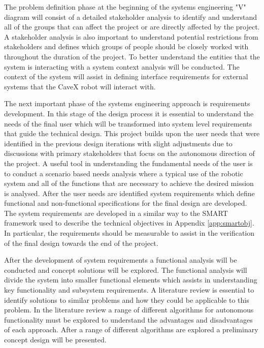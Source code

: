 The problem definition phase at the beginning of the systems engineering "V" diagram will consist of a detailed stakeholder analysis to identify and understand all of the groups that can affect the project or are directly affected by the project. A stakeholder analysis is also important to understand potential restrictions from stakeholders and defines which groups of people should be closely worked with throughout the duration of the project. To better understand the entities that the system is interacting with a system context analysis will be conducted. The context of the system will assist in defining interface requirements for external systems that the CaveX robot will interact with.

The next important phase of the systems engineering approach is requirements development. In this stage of the design process it is essential to understand the needs of the final user which will be transformed into system level requirements that guide the technical design. This project builds upon the user needs that were identified in the previous design iterations with slight adjustments due to discussions with primary stakeholders that focus on the autonomous direction of the project. A useful tool in understanding the fundamental needs of the user is to conduct a scenario based needs analysis where a typical use of the robotic system and all of the functions that are necessary to achieve the desired mission is analysed. After the user needs are identified system requirements which define functional and non-functional specifications for the final design are developed. The system requirements are developed in a similar way to the SMART framework used to describe the technical objectives in Appendix \ref{app:smartobj}. In particular, the requirements should be measurable to assist in the verification of the final design towards the end of the project.

After the development of system requirements a functional analysis will be conducted and concept solutions will be explored. The functional analysis will divide the system into smaller functional elements which assists in understanding key functionality and subsystem requirements. A literature review is essential to identify solutions to similar problems and how they could be applicable to this problem. In the literature review a range of different algorithms for autonomous functionality must be explored to understand the advantages and disadvantages of each approach. After a range of different algorithms are explored a preliminary concept design will be presented.

